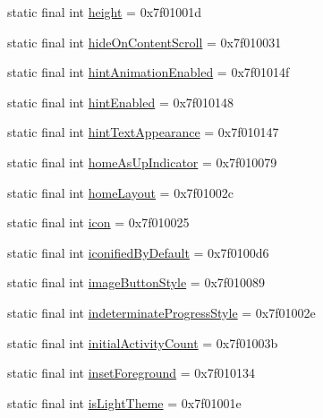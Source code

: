 \begin{CompactItemize}
\item 
static final int \hyperlink{classandroid_1_1support_1_1v7_1_1palette_1_1_r_1_1attr_a4ec581fa96d86085d44778399642859}{height} = 0x7f01001d
\item 
static final int \hyperlink{classandroid_1_1support_1_1v7_1_1palette_1_1_r_1_1attr_600ad5dc118bafcc3fd2207117b59bb6}{hideOnContentScroll} = 0x7f010031
\item 
static final int \hyperlink{classandroid_1_1support_1_1v7_1_1palette_1_1_r_1_1attr_187386d2cb1c104cca6a75bb66e5c797}{hintAnimationEnabled} = 0x7f01014f
\item 
static final int \hyperlink{classandroid_1_1support_1_1v7_1_1palette_1_1_r_1_1attr_35335f02b6269bcf7d9332e72376920e}{hintEnabled} = 0x7f010148
\item 
static final int \hyperlink{classandroid_1_1support_1_1v7_1_1palette_1_1_r_1_1attr_5eea5d045f2fe7d78c625be40aa9029f}{hintTextAppearance} = 0x7f010147
\item 
static final int \hyperlink{classandroid_1_1support_1_1v7_1_1palette_1_1_r_1_1attr_b92d97d50de8ac081a17fae863e0d2cc}{homeAsUpIndicator} = 0x7f010079
\item 
static final int \hyperlink{classandroid_1_1support_1_1v7_1_1palette_1_1_r_1_1attr_874fcca6753785a5235d7eee47a0e810}{homeLayout} = 0x7f01002c
\item 
static final int \hyperlink{classandroid_1_1support_1_1v7_1_1palette_1_1_r_1_1attr_8b1d8e4be7c15f064a43253d2558615c}{icon} = 0x7f010025
\item 
static final int \hyperlink{classandroid_1_1support_1_1v7_1_1palette_1_1_r_1_1attr_e9f623f52e3cacac6aa4484a25db3795}{iconifiedByDefault} = 0x7f0100d6
\item 
static final int \hyperlink{classandroid_1_1support_1_1v7_1_1palette_1_1_r_1_1attr_746fc4203b6c68cd1964055d7ea53411}{imageButtonStyle} = 0x7f010089
\item 
static final int \hyperlink{classandroid_1_1support_1_1v7_1_1palette_1_1_r_1_1attr_d5085b315aa4253052092f5a2d220f21}{indeterminateProgressStyle} = 0x7f01002e
\item 
static final int \hyperlink{classandroid_1_1support_1_1v7_1_1palette_1_1_r_1_1attr_ca5e08ab1839fac5ba8be640d29c8369}{initialActivityCount} = 0x7f01003b
\item 
static final int \hyperlink{classandroid_1_1support_1_1v7_1_1palette_1_1_r_1_1attr_6024e29fbbd9c528df9f1f5fb00ddfbd}{insetForeground} = 0x7f010134
\item 
static final int \hyperlink{classandroid_1_1support_1_1v7_1_1palette_1_1_r_1_1attr_5c8e5c337c64764beff6d3c3068e3cfc}{isLightTheme} = 0x7f01001e

\end{CompactItemize}
